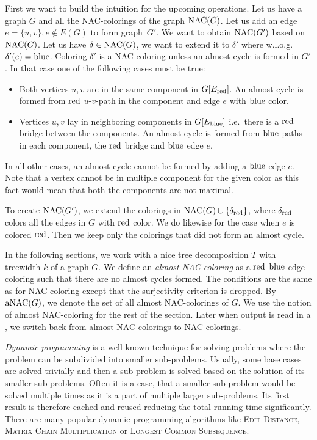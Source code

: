 First we want to build the intuition for the upcoming operations.
Let us have a graph \( G \) and all the NAC-colorings of the graph \( \operatorname{NAC}(G) \).
Let us add an edge \( e = \{u, v\}, e \not\in E(G) \) to form graph~\( G' \).
We want to obtain \( \operatorname{NAC}(G') \) based on \( \operatorname{NAC} (G) \).
%
Let us have \( \delta \in \operatorname{NAC}(G) \),
we want to extend it to \( \delta' \) where w.l.o.g.\ \( \delta'(e) = \text{blue} \).
Coloring \( \delta' \) is a NAC-coloring unless an almost cycle is formed in \( G' \).
In that case one of the following cases must be true:
%
\begin{itemize}
	\item Both vertices \( u, v \) are in the same component in \( G[E_\text{red}] \).
	      An almost cycle is formed
	      from \( \text{red} \) \( u \)-\( v \)-path in the component
	      and edge \( e \) with \( \text{blue} \) color.
	\item Vertices \( u, v \) lay in neighboring components in \( G[E_\text{blue}] \)
	      i.e.\ there is a \( \text{red} \) bridge between the components.
	      An almost cycle is formed from \( \text{blue} \) paths in each component,
	      the \( \text{red} \) bridge and \( \text{blue} \) edge \( e \).
\end{itemize}
%
In all other cases, an almost cycle cannot be formed by adding a \( \text{blue} \) edge \( e \).
Note that a vertex cannot be in multiple component for the given color
as this fact would mean that both the components are not maximal.

To create \( \operatorname{NAC}(G') \), we extend the colorings
in \( \operatorname{NAC}(G) \cup \{ \delta_{\text{red}} \} \), where \( \delta_{\text{red}} \)
colors all the edges in \( G \) with \( \text{red} \) color.
We do likewise for the case when \( e \) is colored \( \text{red} \).
Then we keep only the colorings that did not form an almost cycle.

In the following sections,
we work with a nice tree decomposition \( T \) with treewidth \( k \)
of a graph \( G \).
%
We define an \emph{almost NAC-coloring}
as a \( \text{red} \)-\( \text{blue} \) edge coloring such that there
are no almost cycles formed. The conditions are the same as for NAC-coloring
except that the surjectivity criterion is dropped.
By \( \operatorname{aNAC}(G) \), we denote the set of all almost NAC-colorings of \( G \).
We use the notion of almost NAC-coloring for the rest of the section.
Later when output is read in a \RootNode{},
we switch back from almost NAC-colorings to NAC-colorings.

\emph{Dynamic programming} is a well-known technique for solving problems
where the problem can be subdivided into smaller sub-problems.
Usually, some base cases are solved trivially and then a sub-problem
is solved based on the solution of its smaller sub-problems.
Often it is a case, that a smaller sub-problem would be solved multiple times
as it is a part of multiple larger sub-problems.
Its first result is therefore cached and reused reducing the total running time significantly.
There are many popular dynamic programming algorithms
like \textsc{Edit Distance}, \textsc{Matrix Chain Multiplication} or \textsc{Longest Common Subsequence}.

